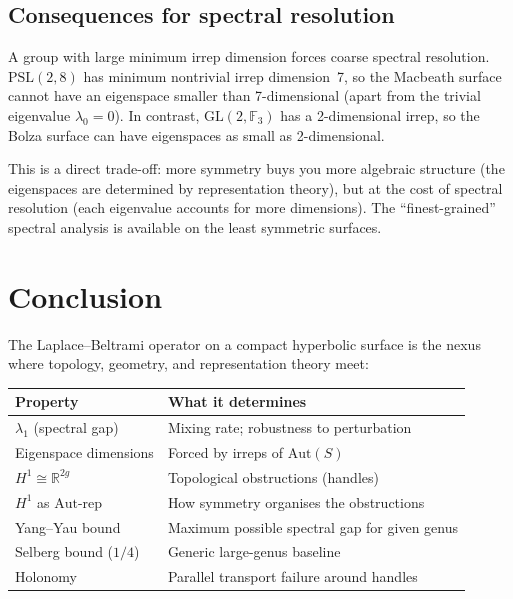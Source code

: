 \documentclass[11pt,a4paper]{article}
\begin{document}
\subsection{Consequences for spectral resolution}

A group with large minimum irrep dimension forces coarse spectral resolution.
$\mathrm{PSL}(2,8)$ has minimum nontrivial irrep dimension~7, so the Macbeath
surface cannot have an eigenspace smaller than 7-dimensional (apart from
the trivial eigenvalue $\lambda_0 = 0$). In contrast,
$\mathrm{GL}(2,\mathbb{F}_3)$ has a 2-dimensional irrep, so the Bolza surface
can have eigenspaces as small as 2-dimensional.

This is a direct trade-off: more symmetry buys you more algebraic structure
(the eigenspaces are determined by representation theory), but at the cost of
spectral resolution (each eigenvalue accounts for more dimensions). The
``finest-grained'' spectral analysis is available on the least symmetric surfaces.

\section{Conclusion}

The Laplace--Beltrami operator on a compact hyperbolic surface is the nexus
where topology, geometry, and representation theory meet:

\medskip
\begin{center}
\renewcommand{\arraystretch}{1.3}
\begin{tabular}{@{}ll@{}}
\toprule
\textbf{Property} & \textbf{What it determines} \\
\midrule
$\lambda_1$ (spectral gap) & Mixing rate; robustness to perturbation \\
Eigenspace dimensions & Forced by irreps of $\mathrm{Aut}(S)$ \\
$H^1 \cong \mathbb{R}^{2g}$ & Topological obstructions (handles) \\
$H^1$ as $\mathrm{Aut}$-rep & How symmetry organises the obstructions \\
Yang--Yau bound & Maximum possible spectral gap for given genus \\
Selberg bound ($1/4$) & Generic large-genus baseline \\
Holonomy & Parallel transport failure around handles \\
\bottomrule
\end{tabular}
\end{center}
\end{document}
